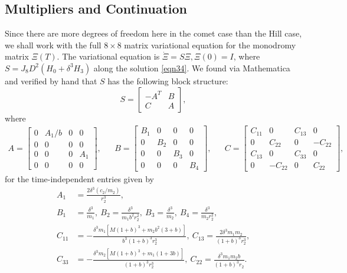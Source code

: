 \documentclass[12pt]{article}
\begin{document}
\subsection{Multipliers and Continuation}
Since there are more degrees of freedom here in the comet case than the Hill case, we shall work with the full $8\times8$ matrix variational equation for the monodromy matrix $\Xi(T)$. The variational equation is $\dot{\Xi} = S\Xi, \Xi(0) = I$, where $S = J_8 D^2(H_0 + \delta^3 H_3)$ along the solution \eqref{eqn34}. We found via Mathematica and verified by hand that $S$ has the following block structure:
\[S = \begin{bmatrix}
-A^T & B \\ C & A
\end{bmatrix},\] 
where
\begin{align*}
A = \begin{bmatrix}
0 & A_1/b & 0 & 0 \\
0 & 0 & 0 & 0 \\
0 & 0 & 0 & A_1 \\
0 & 0 & 0 & 0
\end{bmatrix}, & & B = \begin{bmatrix}
B_1 & 0 & 0 & 0 \\
0 & B_2 & 0 & 0 \\
0 & 0 & B_3 & 0 \\
0 & 0 & 0 & B_4
\end{bmatrix}, & & C = \begin{bmatrix}
C_{11} & 0 & C_{13} & 0 \\
0 & C_{22} & 0 & -C_{22} \\
C_{13} & 0 & C_{33} & 0 \\
0 & -C_{22} & 0 & C_{22} 
\end{bmatrix},
\end{align*}
for the time-independent entries given by
\begin{equation}\label{entriesofS}
\begin{aligned}
A_1 & = \frac{2\delta^3(c_2/m_2)}{r_2^3}, \\
B_1 & = \frac{\delta^3}{m_1},\ B_2 = \frac{\delta^3}{m_1b^2r_2^2},\ B_3 = \frac{\delta^3}{m_2},\ B_4 = \frac{\delta^3}{m_2r_2^2}, \\
C_{11} & = -\frac{\delta^3m_1[M(1+b)^3 + m_2b^2(3+b)]}{b^3(1+b)^3r_2^3},\ C_{13} = \frac{2\delta^3m_1m_2}{(1+b)^3r_2^3},\\
C_{33} & = -\frac{\delta^3m_2[M(1+b)^3 + m_1(1+3b)]}{(1+b)^3r_2^3},\ C_{22} = \frac{\delta^3m_1m_2b}{(1+b)^3r_2}.
\end{aligned}
\end{equation}
\end{document}
